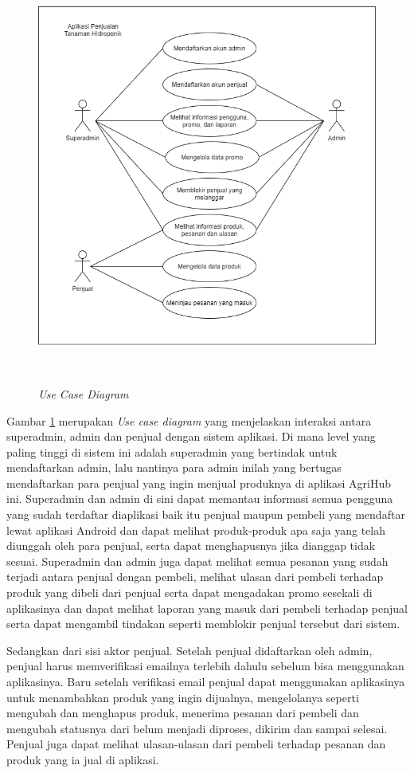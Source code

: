 \begin{figure}[H]
	\centering
	{\includegraphics [width = 13cm, height= 13cm]{gambar/use_case_diagram}}
	\caption{\textit{Use Case Diagram}}
	\label{use_case_diagram}
\end{figure}

\par Gambar \ref*{use_case_diagram} merupakan\textit{ Use case diagram} yang menjelaskan interaksi antara superadmin, admin dan penjual dengan sistem aplikasi. Di mana level yang paling tinggi di sistem ini adalah superadmin yang bertindak untuk mendaftarkan admin, lalu nantinya para admin inilah yang bertugas mendaftarkan para penjual yang ingin menjual produknya di aplikasi AgriHub ini. Superadmin dan admin di sini dapat memantau informasi semua pengguna yang sudah terdaftar diaplikasi baik itu penjual maupun pembeli yang mendaftar lewat aplikasi Android dan dapat melihat produk-produk apa saja yang telah diunggah oleh para penjual, serta dapat menghapusnya jika dianggap tidak sesuai. Superadmin dan admin juga dapat melihat semua pesanan yang sudah terjadi antara penjual dengan pembeli, melihat ulasan dari pembeli terhadap produk yang dibeli dari penjual serta dapat mengadakan promo sesekali di aplikasinya dan dapat melihat laporan yang masuk dari pembeli terhadap penjual serta dapat mengambil tindakan seperti memblokir penjual tersebut dari sistem.
\newpage
\par Sedangkan dari sisi aktor penjual. Setelah penjual didaftarkan oleh admin, penjual harus memverifikasi emailnya terlebih dahulu sebelum bisa menggunakan aplikasinya. Baru setelah verifikasi email penjual dapat menggunakan aplikasinya untuk menambahkan produk yang ingin dijualnya, mengelolanya seperti mengubah dan menghapus produk, menerima pesanan dari pembeli dan mengubah statusnya dari belum menjadi diproses, dikirim dan sampai selesai. Penjual juga dapat melihat ulasan-ulasan dari pembeli terhadap pesanan dan produk yang ia jual di aplikasi.

